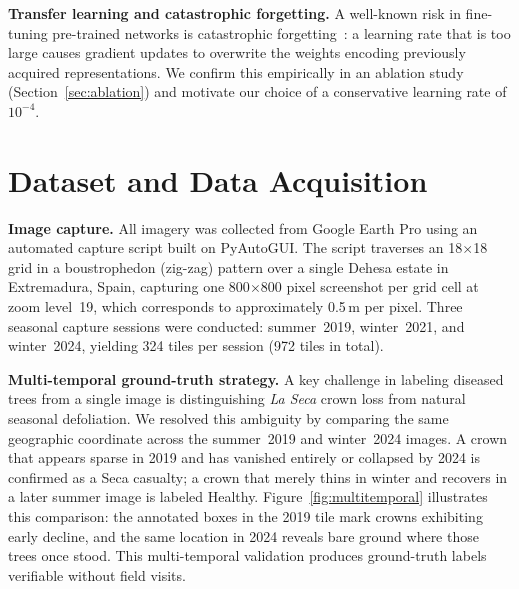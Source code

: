 \documentclass[10pt,twocolumn]{article}
\begin{document}
\textbf{Transfer learning and catastrophic forgetting.}
A well-known risk in fine-tuning pre-trained networks is catastrophic
forgetting~\cite{mccloskey1989catastrophic}: a learning rate that is too
large causes gradient updates to overwrite the weights encoding previously
acquired representations. We confirm this empirically in an ablation study
(Section~\ref{sec:ablation}) and motivate our choice of a conservative
learning rate of $10^{-4}$.

\section{Dataset and Data Acquisition}
\label{sec:data}

\textbf{Image capture.}
All imagery was collected from Google Earth Pro using an automated
capture script built on PyAutoGUI. The
script traverses an 18$\times$18 grid in a boustrophedon (zig-zag) pattern
over a single Dehesa estate in Extremadura, Spain, capturing one 800$\times$800
pixel screenshot per grid cell at zoom level~19, which corresponds to
approximately 0.5\,m per pixel. Three seasonal capture sessions were
conducted: summer~2019, winter~2021, and winter~2024, yielding 324 tiles
per session (972 tiles in total).

\textbf{Multi-temporal ground-truth strategy.}
A key challenge in labeling diseased trees from a single image is
distinguishing \textit{La Seca} crown loss from natural seasonal
defoliation. We resolved this ambiguity by comparing the same geographic
coordinate across the summer~2019 and winter~2024 images. A crown that
appears sparse in 2019 and has vanished entirely or collapsed by 2024 is
confirmed as a Seca casualty; a crown that merely thins in winter and
recovers in a later summer image is labeled Healthy. Figure~\ref{fig:multitemporal}
illustrates this comparison: the annotated boxes in the 2019 tile mark
crowns exhibiting early decline, and the same location in 2024 reveals
bare ground where those trees once stood. This multi-temporal
validation produces ground-truth labels verifiable without field visits.
\end{document}
